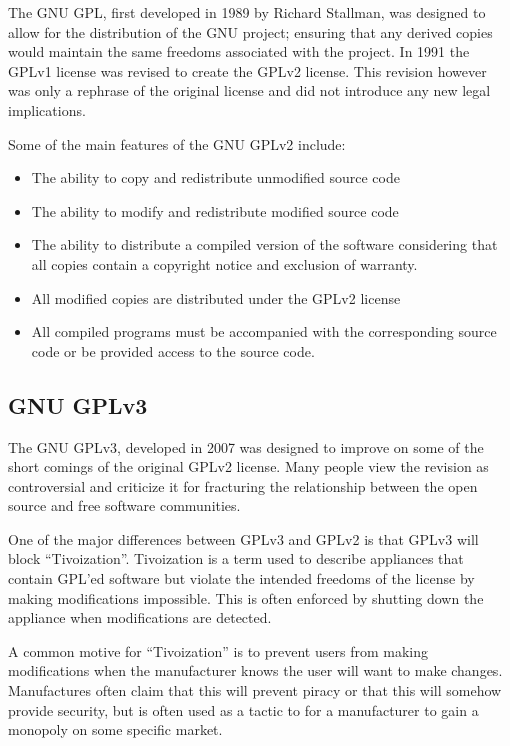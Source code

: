 \documentclass[12pt,letterpaper]{article}
\begin{document}
The GNU GPL, first developed in 1989 by Richard Stallman, was designed to allow for the distribution of the GNU project; ensuring that any derived copies would maintain the same freedoms associated with the project. In 1991 the GPLv1 license was revised to create the GPLv2 license. This revision however was only a rephrase of the original license and did not introduce any new legal implications.

Some of the main features of the GNU GPLv2 include: \cite{gpl2}

\begin{itemize}
\item The ability to copy and redistribute unmodified source code
\item The ability to modify and redistribute modified source code
\item The ability to distribute a compiled version of the software considering that all copies contain a copyright notice and exclusion of warranty.
\item All modified copies are distributed under the GPLv2 license
\item All compiled programs must be accompanied with the corresponding source code or be provided access to the source code.
\end{itemize}

\subsection{GNU GPLv3}

The GNU GPLv3, developed in 2007 was designed to improve on some of the short comings of the original GPLv2 license. Many people view the revision as controversial and criticize it for fracturing the relationship between the open source and free software communities.

One of the major differences between GPLv3 and GPLv2 is that GPLv3 will block ``Tivoization''. Tivoization is a term used to describe appliances that contain GPL'ed software but violate the intended freedoms of the license by making modifications impossible. This is often enforced by shutting down the appliance when modifications are detected.

A common motive for ``Tivoization'' is to prevent users from making modifications when the manufacturer knows the user will want to make changes. Manufactures often claim that this will prevent piracy or that this will somehow provide security, but is often used as a tactic to for a manufacturer to gain a monopoly on some specific market.
\end{document}
